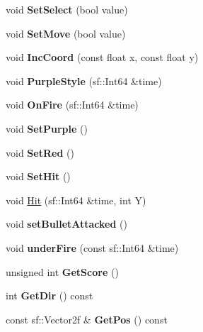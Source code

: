 \begin{DoxyCompactItemize}
void {\bfseries Set\+Select} (bool value)
\item 
\mbox{\label{class_player_a4460f69d665a8e9bfd65dab4482b834a}} 
void {\bfseries Set\+Move} (bool value)
\item 
\mbox{\label{class_player_a711adfffe304ec88e99c94520048c1f4}} 
void {\bfseries Inc\+Coord} (const float x, const float y)
\item 
\mbox{\label{class_player_aba7c42e8bcf1e71d8e326e851537e718}} 
void {\bfseries Purple\+Style} (sf\+::\+Int64 \&time)
\item 
\mbox{\label{class_player_a0a2066460adf9ce32fb427aeedcd1d52}} 
void {\bfseries On\+Fire} (sf\+::\+Int64 \&time)
\item 
\mbox{\label{class_player_a1014b3b4371a692f7e64072d1b3bd850}} 
void {\bfseries Set\+Purple} ()
\item 
\mbox{\label{class_player_a31cc502c119e0b4646de70bd95fc3710}} 
void {\bfseries Set\+Red} ()
\item 
\mbox{\label{class_player_ab14c9bfde9a1fd899bd1304ca7c2f7e7}} 
void {\bfseries Set\+Hit} ()
\item 
void \hyperlink{class_player_abb881e3cbced276d41fb3d4a3ba4b329}{Hit} (sf\+::\+Int64 \&time, int Y)
\item 
\mbox{\label{class_player_aa9dd6c08df215dd4503060f9414b9ae0}} 
void {\bfseries set\+Bullet\+Attacked} ()
\item 
\mbox{\label{class_player_a60debcbc368b0990861bbc2f27838384}} 
void {\bfseries under\+Fire} (const sf\+::\+Int64 \&time)
\item 
\mbox{\label{class_player_a169b68ee9a8e5d955675eed2711d5a9a}} 
unsigned int {\bfseries Get\+Score} ()
\item 
\mbox{\label{class_player_a0abe75980955815f82d757f281eeb43f}} 
int {\bfseries Get\+Dir} () const
\item 
\mbox{\label{class_player_a404208da6ae6ca92a6c66ef391fcd5cd}} 
const sf\+::\+Vector2f \& {\bfseries Get\+Pos} () const
\end{DoxyCompactItemize}
